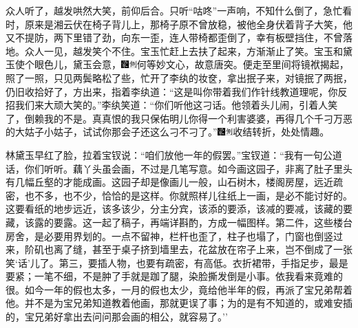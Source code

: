 众人听了，越发哄然大笑，前仰后合。只听``咕咚''一声响，不知什么倒了，急忙看时，原来是湘云伏在椅子背儿上，那椅子原不曾放稳，被他全身伏着背子大笑，他又不提防，两下里错了劲，向东一歪，连人带椅都歪倒了，幸有板壁挡住，不曾落地。众人一见，越发笑个不住。宝玉忙赶上去扶了起来，方渐渐止了笑。宝玉和黛玉使个眼色儿，黛玉会意，{\includegraphics[width=3mm]{../Images/00006}\includegraphics[width=3mm]{../Images/00011}\footnotesize \kaishu 何等妙文心，故意唐突。}便走至里间将镜袱揭起，照了一照，只见两鬓略松了些，忙开了李纨的妆奁，拿出抿子来，对镜抿了两抿，仍旧收拾好了，方出来，指着李纨道：``这是叫你带着我们作针线教道理呢，你反招我们来大顽大笑的。''李纨笑道：``你们听他这刁话。他领着头儿闹，引着人笑了，倒赖我的不是。真真恨的我只保佑明儿你得一个利害婆婆，再得几个千刁万恶的大姑子小姑子，试试你那会子还这么刁不刁了。''{\includegraphics[width=3mm]{../Images/00006}\includegraphics[width=3mm]{../Images/00011}\footnotesize \kaishu 收结转折，处处情趣。}

林黛玉早红了脸，拉着宝钗说：``咱们放他一年的假罢。''宝钗道：``我有一句公道话，你们听听。藕丫头虽会画，不过是几笔写意。如今画这园子，非离了肚子里头有几幅丘壑的才能成画。这园子却是像画儿一般，山石树木，楼阁房屋，远近疏密，也不多，也不少，恰恰的是这样。你就照样儿往纸上一画，是必不能讨好的。这要看纸的地步远近，该多该少，分主分宾，该添的要添，该减的要减，该藏的要藏，该露的要露。这一起了稿子，再端详斟酌，方成一幅图样。第二件，这些楼台房舍，是必要用界划的。一点不留神，栏杆也歪了，柱子也塌了，门窗也倒竖过来，阶矶也离了缝，甚至于桌子挤到墙里去，花盆放在帘子上来，岂不倒成了一张笑`话'儿了。第三，要插人物，也要有疏密，有高低。衣折裙带，手指足步，最是要紧；一笔不细，不是肿了手就是跏了腿，染脸撕发倒是小事。依我看来竟难的很。如今一年的假也太多，一月的假也太少，竟给他半年的假，再派了宝兄弟帮着他。并不是为宝兄弟知道教着他画，那就更误了事；为的是有不知道的，或难安插的，宝兄弟好拿出去问问那会画的相公，就容易了。''

